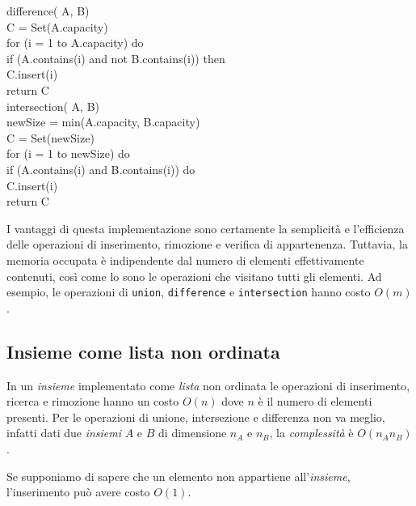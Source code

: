 \begin{codecont}
\ind{} difference( A,  B)\\
     C = Set(A.capacity)\\
    for (i = 1 to A.capacity) do\\
        \indf if (A.contains(i) and not B.contains(i)) then\\
            \indff C.insert(i)\\
    \ind return C\\
\nl\ind{} intersection( A,  B)\\
     newSize = min(A.capacity, B.capacity)\\
     C = Set(newSize)\\
    for (i = 1 to newSize) do\\
        \indf if (A.contains(i) and B.contains(i)) do\\
            \indff C.insert(i)\\
    \indent return C
\end{codecont}

\bigskip\noindent
I vantaggi di questa implementazione sono certamente la semplicità e
l'efficienza delle operazioni di inserimento, rimozione e verifica di appartenenza.
Tuttavia, la memoria occupata è indipendente dal numero di elementi effettivamente
contenuti, così come lo sono le operazioni che visitano tutti gli elementi.
Ad esempio, le operazioni di \texttt{union}, \texttt{difference} e
\texttt{intersection} hanno costo $O(m)$.

\subsection{Insieme come lista non ordinata}
In un \emph{insieme} implementato come \emph{lista} non ordinata le operazioni
di inserimento, ricerca e rimozione hanno un costo $O(n)$ dove $n$ è il numero
di elementi presenti. Per le operazioni di unione, intersezione e differenza
non va meglio, infatti dati due \emph{insiemi} $A$ e $B$ di dimensione $n_A$ e
$n_B$, la \emph{complessità} è $O(n_An_B)$.

\begin{note}
    Se supponiamo di sapere che un elemento non appartiene all'\emph{insieme},
    l'inserimento può avere costo $O(1)$.
\end{note}

